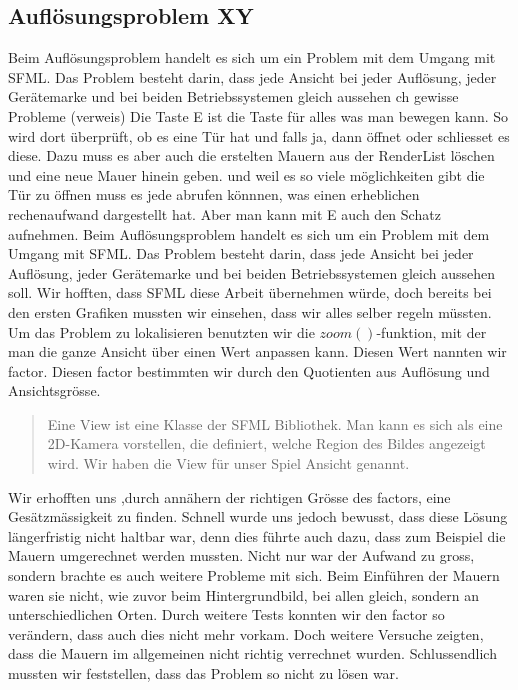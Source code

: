 \documentclass[12pt,a4paper]{scrartcl}
\begin{document}
\subsection{Auflösungsproblem XY} 	
\label{aufloesungsprobleme} 	
Beim Auflösungsproblem handelt es sich um ein Problem mit dem Umgang mit SFML. 	
Das Problem besteht darin, dass jede Ansicht bei jeder Auflösung, jeder Gerätemarke und bei beiden Betriebssystemen gleich aussehen ch gewisse Probleme (verweis) 	
Die Taste E ist die Taste für alles was man bewegen kann. So wird dort überprüft, ob es eine Tür hat und falls ja, dann öffnet oder schliesset es diese. Dazu muss es aber auch die erstelten Mauern aus der RenderList löschen und eine neue Mauer hinein geben. und weil es so viele möglichkeiten gibt die Tür zu öffnen muss es jede abrufen könnnen, was einen erheblichen rechenaufwand dargestellt hat. Aber man kann mit E auch den Schatz aufnehmen.
\label{aufloesungsprobleme}
Beim Auflösungsproblem handelt es sich um ein Problem mit dem Umgang mit SFML.
Das Problem besteht darin, dass jede Ansicht bei jeder Auflösung, jeder Gerätemarke und bei beiden Betriebssystemen gleich aussehen soll.
Wir hofften, dass SFML diese Arbeit übernehmen würde, doch bereits bei den ersten Grafiken mussten wir einsehen, dass wir alles selber regeln müssten.
Um das Problem zu lokalisieren benutzten wir die $zoom()$-funktion, mit der man die ganze Ansicht über einen Wert anpassen kann.
Diesen Wert nannten wir factor.
Diesen factor bestimmten wir durch den Quotienten aus Auflösung und Ansichtsgrösse.
\begin{quote}
Eine View ist eine Klasse der SFML Bibliothek.
Man kann es sich als eine 2D-Kamera vorstellen, die definiert, welche Region des Bildes angezeigt wird.
Wir haben die View für unser Spiel Ansicht genannt.
\end{quote}
Wir erhofften uns ,durch annähern der richtigen Grösse des factors, eine Gesätzmässigkeit zu finden.
Schnell wurde uns jedoch bewusst, dass diese Lösung längerfristig nicht haltbar war,
denn dies führte auch dazu, dass zum Beispiel die Mauern umgerechnet werden mussten.
Nicht nur war der Aufwand zu gross, sondern brachte es auch weitere Probleme mit sich.
Beim Einführen der Mauern waren sie nicht, wie zuvor beim Hintergrundbild, 
bei allen gleich, sondern an unterschiedlichen Orten.
Durch weitere Tests konnten wir den factor so verändern, dass auch dies nicht mehr vorkam.
Doch weitere Versuche zeigten, dass die Mauern im allgemeinen nicht richtig verrechnet wurden.
Schlussendlich mussten wir feststellen, dass das Problem so nicht zu lösen war.
\end{document}
